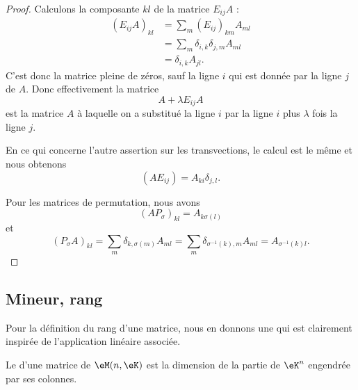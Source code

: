 \begin{proof}
	Calculons la composante \( kl\) de la matrice \( E_{ij}A\) :
	\begin{subequations}
		\begin{align}
			(E_{ij}A)_{kl} & =\sum_m(E_{ij})_{km}A_{ml}            \\
			               & =\sum_m\delta_{i,k}\delta_{j,m}A_{ml} \\
			               & =\delta_{i,k}A_{jl}.
		\end{align}
	\end{subequations}
	C'est donc la matrice pleine de zéros, sauf la ligne \( i\) qui est donnée par la ligne \( j\) de \( A\). Donc effectivement la matrice
	\begin{equation}
		A+\lambda E_{ij}A
	\end{equation}
	est la matrice \( A\) à laquelle on a substitué la ligne \( i\) par la ligne \( i\) plus \( \lambda\) fois la ligne \( j\).

	En ce qui concerne l'autre assertion sur les transvections, le calcul est le même et nous obtenons
	\begin{equation}
		(AE_{ij})=A_{ki}\delta_{j,l}.
	\end{equation}

	Pour les matrices de permutation, nous avons
	\begin{equation}
		(AP_{\sigma})_{kl}=A_{k\sigma(l)}
	\end{equation}
	et
	\begin{equation}
		(P_{\sigma}A)_{kl}=\sum_m\delta_{k,\sigma(m)}A_{ml}=\sum_m\delta_{\sigma^{-1}(k),m}A_{ml}=A_{\sigma^{-1}(k)l}.
	\end{equation}
\end{proof}

\subsection{Mineur, rang}

Pour la définition du rang d'une matrice, nous en donnons une qui est clairement inspirée de l'application linéaire associée.
\begin{definition}       \label{DEFooCSGXooFRzLRj}
	Le  d'une matrice de \( \eM(n,\eK)\) est la dimension de la partie de \( \eK^n\) engendrée par ses colonnes.
\end{definition}

